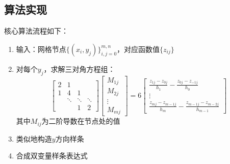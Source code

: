 \subsection{算法实现}
核心算法流程如下：
\begin{enumerate}
    \item 输入：网格节点$\{(x_i,y_j)\}_{i,j=0}^{m,n}$，对应函数值$\{z_{ij}\}$
    \item 对每个$y_j$，求解三对角方程组：
    \begin{equation}
        \begin{bmatrix}
        2 & 1 & & \\
        1 & 4 & 1 & \\
        & \ddots & \ddots & \ddots \\
        & & 1 & 2
        \end{bmatrix}
        \begin{bmatrix}
        M_{1j} \\ M_{2j} \\ \vdots \\ M_{mj}
        \end{bmatrix}
        = 6
        \begin{bmatrix}
        \frac{z_{1j}-z_{0j}}{h_1} - \frac{z_{0j}-z_{-1j}}{h_0} \\
        \vdots \\
        \frac{z_{mj}-z_{m-1j}}{h_m} - \frac{z_{m-1j}-z_{m-2j}}{h_{m-1}}
        \end{bmatrix}
    \end{equation}
    其中$M_{ij}$为二阶导数在节点处的值
    \item 类似地构造$y$方向样条
    \item 合成双变量样条表达式
\end{enumerate}




